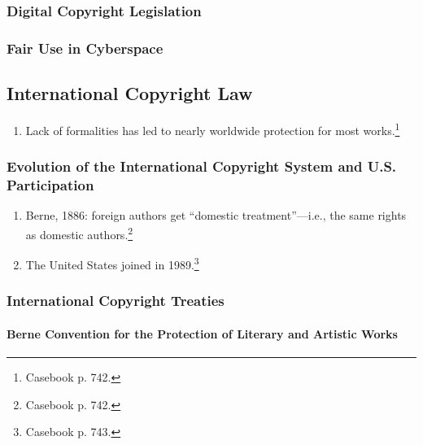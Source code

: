 \subsubsection{Digital Copyright Legislation}


\subsubsection{Fair Use in Cyberspace}


\newpage %

\subsection{International Copyright Law}

\begin{enumerate}
    \item Lack of formalities has led to nearly worldwide protection for most 
    works.\footnote{Casebook p. 742.}
\end{enumerate}

\subsubsection{Evolution of the International Copyright System and U.S. 
Participation}

\begin{enumerate}
    \item Berne, 1886: foreign authors get ``domestic treatment''---i.e., the 
    same rights as domestic authors.\footnote{Casebook p. 742.}
    \item The United States joined in 1989.\footnote{Casebook p. 743.}
\end{enumerate}

\subsubsection{International Copyright Treaties}

\paragraph{Berne Convention for the Protection of Literary and Artistic Works}


